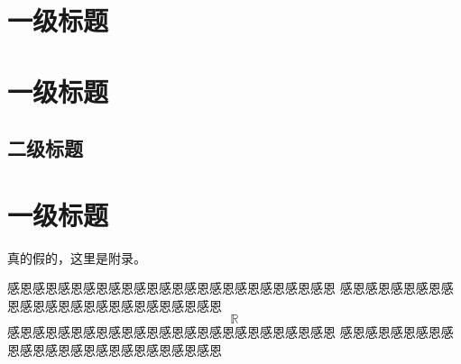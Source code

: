 \documentclass[printMode=false, declarePage=false]{ecnuthesis}
\begin{document}
\chapter{一级标题}
\chapter{一级标题}


\section{二级标题}
\chapter{一级标题}

\backmatter


\begin{appendix}
  真的假的，这里是附录。
\end{appendix}

\PrintReference

\begin{acknowledgement}
  感恩感恩感恩感恩感恩感恩感恩感恩感恩感恩感恩感恩感恩
  感恩感恩感恩感恩感恩感恩感恩感恩感恩感恩感恩感恩感恩
  \[ \mathbb{R} \]
  感恩感恩感恩感恩感恩感恩感恩感恩感恩感恩感恩感恩感恩
  感恩感恩感恩感恩感恩感恩感恩感恩感恩感恩感恩感恩感恩
\end{acknowledgement}
\end{document}
